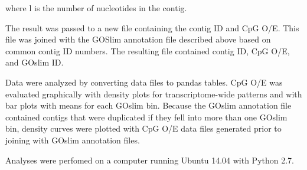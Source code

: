 where l is the number of nucleotides in the contig.

The result was passed to a new file containing the contig ID and CpG O/E. This file was joined with the GOSlim annotation file described above based on common contig ID numbers. The resulting file contained contig ID, CpG O/E, and GOslim ID.

Data were analyzed by converting data files to pandas tables. CpG O/E was evaluated graphically with density plots for transcriptome-wide patterns and with bar plots with means for each GOslim bin. Because the GOslim annotation file contained contigs that were duplicated if they fell into more than one GOslim bin, density curves were plotted with CpG O/E data files generated prior to joining with GOslim annotation files.

Analyses were perfomed on a computer running Ubuntu 14.04 with Python 2.7.